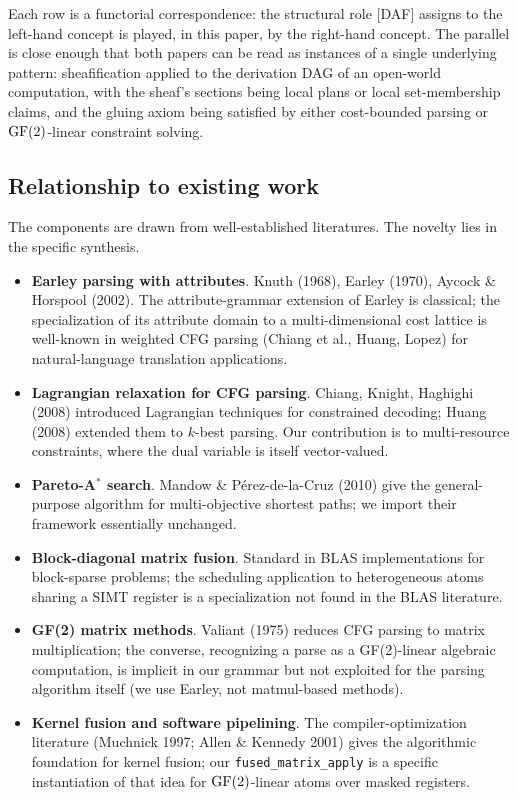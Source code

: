 Each row is a functorial correspondence: the
structural role [DAF] assigns to the left-hand
concept is played, in this paper, by the right-hand
concept. The parallel is close enough that both
papers can be read as instances of a single
underlying pattern: sheafification applied to the
derivation DAG of an open-world computation, with
the sheaf's sections being local plans or local
set-membership claims, and the gluing axiom being
satisfied by either cost-bounded parsing or
$\operatorname{GF}(2)$-linear constraint solving.

\subsection{Relationship to existing work}

The components are drawn from well-established
literatures. The novelty lies in the specific
synthesis.

\begin{itemize}[nosep]
  \item \textbf{Earley parsing with attributes}.
    Knuth (1968), Earley (1970), Aycock \& Horspool
    (2002). The attribute-grammar extension of
    Earley is classical; the specialization of its
    attribute domain to a multi-dimensional cost
    lattice is well-known in weighted CFG parsing
    (Chiang et al., Huang, Lopez) for natural-language
    translation applications.
  \item \textbf{Lagrangian relaxation for CFG parsing}.
    Chiang, Knight, Haghighi (2008) introduced
    Lagrangian techniques for constrained
    decoding; Huang (2008) extended them to
    $k$-best parsing. Our contribution is to
    multi-resource constraints, where the dual
    variable is itself vector-valued.
  \item \textbf{Pareto-A$^*$ search}. Mandow \&
    P\'{e}rez-de-la-Cruz (2010) give the
    general-purpose algorithm for multi-objective
    shortest paths; we import their framework
    essentially unchanged.
  \item \textbf{Block-diagonal matrix fusion}.
    Standard in BLAS implementations for
    block-sparse problems; the scheduling
    application to heterogeneous atoms sharing a
    SIMT register is a specialization not found in
    the BLAS literature.
  \item \textbf{GF(2) matrix methods}. Valiant
    (1975) reduces CFG parsing to matrix
    multiplication; the converse, recognizing a
    parse as a GF(2)-linear algebraic computation,
    is implicit in our grammar but not exploited for
    the parsing algorithm itself (we use Earley,
    not matmul-based methods).
  \item \textbf{Kernel fusion and software
    pipelining}. The compiler-optimization
    literature (Muchnick 1997; Allen \& Kennedy
    2001) gives the algorithmic foundation for
    kernel fusion; our \texttt{fused\_matrix\_apply}
    is a specific instantiation of that idea for
    $\operatorname{GF}(2)$-linear atoms over masked registers.
\end{itemize}

